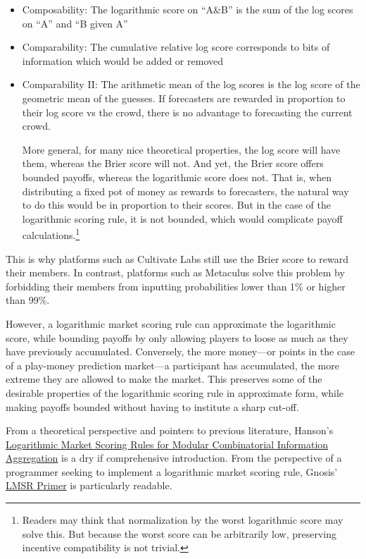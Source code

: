 \documentclass[]{article}
\begin{document}
\begin{itemize}
\item
  Composability: The logarithmic score on ``A\&B'' is the sum of the log
  scores on ``A'' and ``B given A''
\item
  Comparability: The cumulative relative log score corresponds to bits
  of information which would be added or removed
\item
  Comparability II: The arithmetic mean of the log scores is the log
  score of the geometric mean of the guesses. If forecasters are
  rewarded in proportion to their log score vs the crowd, there is no
  advantage to forecasting the current crowd.

  More general, for many nice theoretical properties, the log score will
  have them, whereas the Brier score will not. And yet, the Brier score
  offers bounded payoffs, whereas the logarithmic score does not. That
  is, when distributing a fixed pot of money as rewards to forecasters,
  the natural way to do this would be in proportion to their scores. But
  in the case of the logarithmic scoring rule, it is not bounded, which
  would complicate payoff calculations.\footnote{Readers may think that
    normalization by the worst logarithmic score may solve this. But
    because the worst score can be arbitrarily low, preserving incentive
    compatibility is not trivial.}
\end{itemize}

This is why platforms such as Cultivate Labs still use the Brier score
to reward their members. In contrast, platforms such as Metaculus solve
this problem by forbidding their members from inputting probabilities
lower than 1\% or higher than 99\%.

However, a logarithmic market scoring rule can approximate the
logarithmic score, while bounding payoffs by only allowing players to
loose as much as they have previously accumulated. Conversely, the more
money---or points in the case of a play-money prediction market---a
participant has accumulated, the more extreme they are allowed to make
the market. This preserves some of the desirable properties of the
logarithmic scoring rule in approximate form, while making payoffs
bounded without having to institute a sharp cut-off.

From a theoretical perspective and pointers to previous literature,
Hanson's \href{https://mason.gmu.edu/~rhanson/mktscore.pdf}{Logarithmic
Market Scoring Rules for Modular Combinatorial Information Aggregation}
is a dry if comprehensive introduction. From the perspective of a
programmer seeking to implement a logarithmic market scoring rule,
Gnosis'
\href{https://gnosis-pm-js.readthedocs.io/en/v1.3.0/lmsr-primer.html}{LMSR
Primer} is particularly readable.
\end{document}
